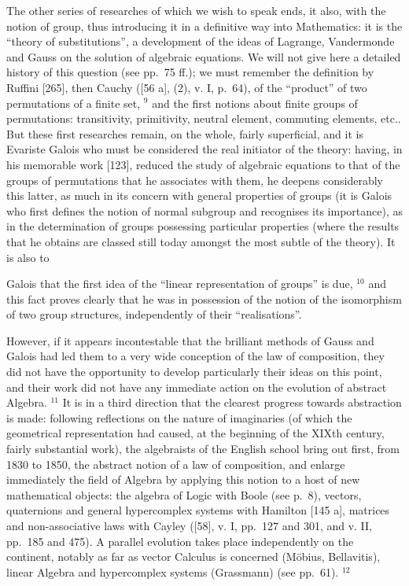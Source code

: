 The other series of researches of which we wish to speak ends, it also, with the notion of group, thus introducing it in a definitive way into Mathematics: it is the ``theory of substitutions'', a development of the ideas of Lagrange, Vandermonde and Gauss on the solution of algebraic equations. We will not give here a detailed history of this question (see pp.~75 ff.); we must remember the definition by Ruffini {[}265{]}, then Cauchy ({[}56 a{]}, (2), v. I, p.~64), of the ``product'' of two permutations of a finite set, \(^{9}\) and the first notions about finite groups of permutations: transitivity, primitivity, neutral element, commuting elements, etc.. But these first researches remain, on the whole, fairly superficial, and it is Evariste Galois who must be considered the real initiator of the theory: having, in his memorable work {[}123{]}, reduced the study of algebraic equations to that of the groups of permutations that he associates with them, he deepens considerably this latter, as much in its concern with general properties of groups (it is Galois who first defines the notion of normal subgroup and recognises its importance), as in the determination of groups possessing particular properties (where the results that he obtains are classed still today amongst the most subtle of the theory). It is also to

Galois that the first idea of the ``linear representation of groups'' is due, \(^{10}\) and this fact proves clearly that he was in possession of the notion of the isomorphism of two group structures, independently of their ``realisations''.

However, if it appears incontestable that the brilliant methods of Gauss and Galois had led them to a very wide conception of the law of composition, they did not have the opportunity to develop particularly their ideas on this point, and their work did not have any immediate action on the evolution of abstract Algebra. \(^{11}\) It is in a third direction that the clearest progress towards abstraction is made: following reflections on the nature of imaginaries (of which the geometrical representation had caused, at the beginning of the XIXth century, fairly substantial work), the algebraists of the English school bring out first, from 1830 to 1850, the abstract notion of a law of composition, and enlarge immediately the field of Algebra by applying this notion to a host of new mathematical objects: the algebra of Logic with Boole (see p.~8), vectors, quaternions and general hypercomplex systems with Hamilton {[}145 a{]}, matrices and non-associative laws with Cayley ({[}58{]}, v. I, pp.~127 and 301, and v. II, pp.~185 and 475). A parallel evolution takes place independently on the continent, notably as far as vector Calculus is concerned (Möbius, Bellavitis), linear Algebra and hypercomplex systems (Grassmann) (see pp.~61). \(^{12}\)

